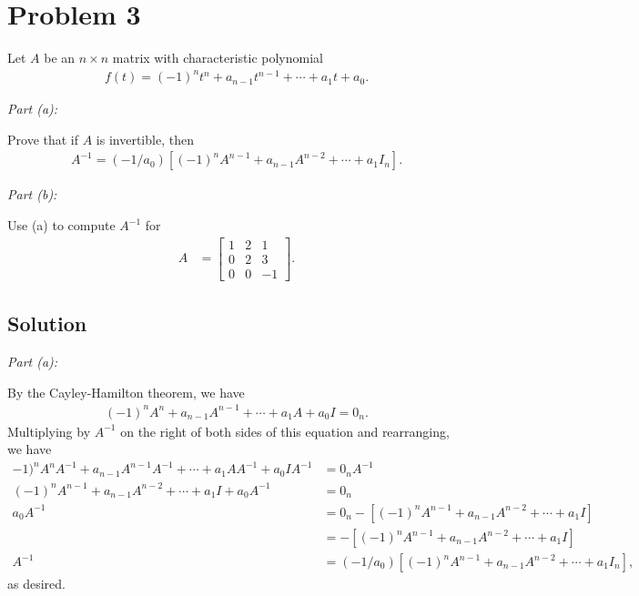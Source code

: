 \documentclass[10pt,a4paper]{article}
\makeatletter
\newcommand{\proofpart}[2]{%
  \par
  \addvspace{\medskipamount}%
  \noindent\emph{Part #1: #2}\par\nobreak
  \addvspace{\smallskipamount}%
  \@afterheading
}
\theoremstyle{definition}
\makeatother
\begin{document}
\section*{Problem 3}
Let $A$ be an $n \times n$ matrix with characteristic polynomial
\begin{align*}
f(t) = (-1)^n t^n + a_{n-1} t^{n-1} + \cdots + a_1 t + a_0.
\end{align*}
\proofpart{(a)}{} Prove that if $A$ is invertible, then
\begin{align*}
A^{-1} = (-1/a_0) [(-1)^n A^{n-1} + a_{n-1} A^{n-2} + \cdots + a_1 I_n].
\end{align*}
\proofpart{(b)}{} Use (a) to compute $A^{-1}$ for 
\begin{align*}
A &= \begin{bmatrix}
1 & 2 & 1\\
0 & 2 & 3\\
0 & 0 & -1
\end{bmatrix}.
\end{align*}

\subsection*{Solution}
\proofpart{(a)}{} By the Cayley-Hamilton theorem, we have
\begin{align*}
(-1)^n A^n + a_{n-1} A^{n-1} + \cdots + a_1 A + a_0I = 0_n.
\end{align*}
Multiplying by $A^{-1}$ on the right of both sides of this equation and rearranging, we have
\begin{align*}
-1)^n A^n A^{-1} + a_{n-1} A^{n-1}A^{-1} + \cdots + a_1 AA^{-1} + a_0IA^{-1} &= 0_nA^{-1}\\
(-1)^n A^{n-1} + a_{n-1} A^{n-2} + \cdots + a_1 I + a_0A^{-1} &= 0_n\\
a_0A^{-1} &= 0_n - [(-1)^n A^{n-1} + a_{n-1} A^{n-2} + \cdots + a_1 I]\\
&= - [(-1)^n A^{n-1} + a_{n-1} A^{n-2} + \cdots + a_1 I]\\
A^{-1} &= (-1/a_0) [(-1)^n A^{n-1} + a_{n-1} A^{n-2} + \cdots + a_1 I_n],
\end{align*}
as desired.
\end{document}
